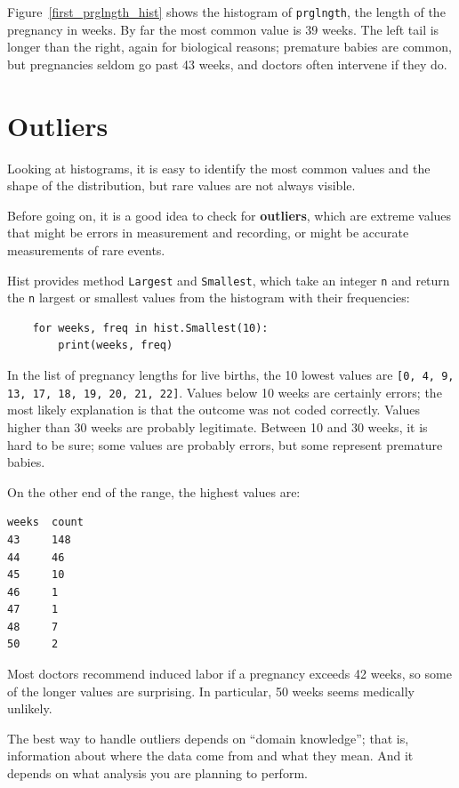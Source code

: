\documentclass[12pt]{book}
\begin{document}
Figure~\ref{first_prglngth_hist} shows the histogram of \verb"prglngth",
the length of the pregnancy in weeks.  By far the most common value
is 39 weeks.  The left tail is longer than the right, again for
biological reasons; premature babies are common, but pregnancies seldom
go past 43 weeks, and doctors often intervene if they do. 


\section{Outliers}

Looking at histograms, it is easy to identify the most common
values and the shape of the distribution, but rare values are
not always visible.

Before going on, it is a good idea to check for {\bf
  outliers}, which are extreme values that might be errors in
measurement and recording, or might be accurate measurements of rare
events.

Hist provides method {\tt Largest} and {\tt Smallest}, which take
an integer {\tt n} and return the {\tt n} largest or smallest
values from the histogram with their frequencies:

\begin{verbatim}
    for weeks, freq in hist.Smallest(10):
        print(weeks, freq)
\end{verbatim}

In the list of pregnancy lengths for live births, the 10 lowest values
are {\tt [0, 4, 9, 13, 17, 18, 19, 20, 21, 22]}.  Values below 10 weeks
are certainly errors; the most likely explanation is that the outcome
was not coded correctly.  Values higher than 30 weeks are probably
legitimate.  Between 10 and 30 weeks, it is hard to be sure; some
values are probably errors, but some represent premature babies.

On the other end of the range, the highest values are:
%
\begin{verbatim}
weeks  count
43     148
44     46
45     10
46     1
47     1
48     7
50     2
\end{verbatim}

Most doctors recommend induced labor if a pregnancy exceeds 42 weeks,
so some of the longer values are surprising.  In particular, 50 weeks
seems medically unlikely.

The best way to handle outliers depends on ``domain knowledge'';
that is, information about where the data come from and what they
mean.  And it depends on what analysis you are planning to perform.
\end{document}
